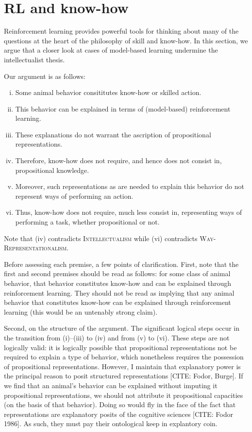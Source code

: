 \section{RL and know-how}

Reinforcement learning provides powerful tools for thinking about many of the questions at the heart of the philosophy of skill and know-how.
In this section, we argue that a closer look at cases of model-based learning undermine the intellectualist thesis.

Our argument is as follows: 
\begin{enumerate}[(i)]
\item	Some animal behavior consititutes know-how or skilled action.
\item This behavior can be explained in terms of (model-based) reinforcement learning.
\item These explanations do not warrant the ascription of propositional representations.
\item Therefore, know-how does not require, and hence does not consist in, propositional knowledge.
\item Moreover, such representations as are needed to explain this behavior do not represent ways of performing an action.
\item Thus, know-how does not require, much less consist in, representing ways of performing a task, whether propositional or not.
\end{enumerate}
Note that (iv) contradicts \textsc{Intellectualism} while (vi) contradicts \textsc{Way-Representationalism}.

Before assessing each premise, a few points of clarification.
First, note that the first and second premises should be read as follows: for some class of animal behavior, that behavior constitutes know-how and can be explained through reinforcement learning.
They should not be read as implying that any animal behavior that constitutes know-how can be explained through reinforcement learning (this would be an untenably strong claim). 

Second, on the structure of the argument.
The significant logical steps occur in the transition from (i)--(iii) to (iv) and from (v) to (vi).
These steps are not logically valid: it is logically possible that propositional representations not be required to explain a type of behavior, which nonetheless requires the possession of propositional representations.
However, I maintain that explanatory power is the principal reason to posit structured representations [CITE: Fodor, Burge].
If we find that an animal's behavior can be explained without imputing it propositional representations, we should not attribute it propositional capacities (on the basis of that behavior).
Doing so would fly in the face of the fact that representations are explanatory posits of the cognitive sciences [CITE: Fodor 1986].
As such, they must pay their ontological keep in explantory coin.

